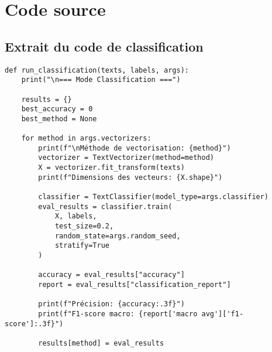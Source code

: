 \documentclass[a4paper,11pt]{article}
\begin{document}
\appendix
\section{Code source}
\label{app:code}

\subsection{Extrait du code de classification}
\begin{lstlisting}[caption=Implémentation du classificateur]
def run_classification(texts, labels, args):
    print("\n=== Mode Classification ===")
    
    results = {}
    best_accuracy = 0
    best_method = None
    
    for method in args.vectorizers:
        print(f"\nMéthode de vectorisation: {method}")
        vectorizer = TextVectorizer(method=method)
        X = vectorizer.fit_transform(texts)
        print(f"Dimensions des vecteurs: {X.shape}")
        
        classifier = TextClassifier(model_type=args.classifier)
        eval_results = classifier.train(
            X, labels, 
            test_size=0.2, 
            random_state=args.random_seed, 
            stratify=True
        )
        
        accuracy = eval_results["accuracy"]
        report = eval_results["classification_report"]
        
        print(f"Précision: {accuracy:.3f}")
        print(f"F1-score macro: {report['macro avg']['f1-score']:.3f}")
        
        results[method] = eval_results
\end{lstlisting}
\end{document}
